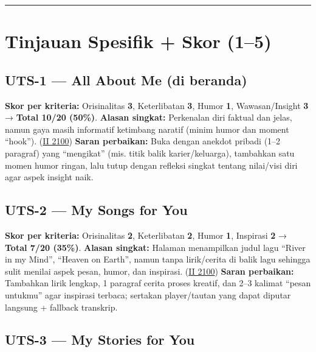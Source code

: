 \documentclass[
  letterpaper,
  DIV=11,
  numbers=noendperiod]{scrreprt}
\begin{document}
\begin{center}\rule{0.5\linewidth}{0.5pt}\end{center}

\section{Tinjauan Spesifik + Skor
(1--5)}\label{tinjauan-spesifik-skor-15}

\subsection{UTS-1 --- All About Me (di
beranda)}\label{uts-1-all-about-me-di-beranda}

\textbf{Skor per kriteria:} Orisinalitas \textbf{3}, Keterlibatan
\textbf{3}, Humor \textbf{1}, Wawasan/Insight \textbf{3} → \textbf{Total
10/20 (50\%)}. \textbf{Alasan singkat:} Perkenalan diri faktual dan
jelas, namun gaya masih informatif ketimbang naratif (minim humor dan
moment ``hook''). (\href{https://ii-2100.github.io/all-about-me/}{II
2100}) \textbf{Saran perbaikan:} Buka dengan anekdot pribadi (1--2
paragraf) yang ``mengikat'' (mis. titik balik karier/keluarga),
tambahkan satu momen humor ringan, lalu tutup dengan refleksi singkat
tentang nilai/visi diri agar aspek insight naik.

\subsection{UTS-2 --- My Songs for You}\label{uts-2-my-songs-for-you}

\textbf{Skor per kriteria:} Orisinalitas \textbf{2}, Keterlibatan
\textbf{2}, Humor \textbf{1}, Inspirasi \textbf{2} → \textbf{Total 7/20
(35\%)}. \textbf{Alasan singkat:} Halaman menampilkan judul lagu ``River
in my Mind'', ``Heaven on Earth'', namun tanpa lirik/cerita di balik
lagu sehingga sulit menilai aspek pesan, humor, dan inspirasi.
(\href{https://ii-2100.github.io/all-about-me/My_Song_for_You/index.html}{II
2100}) \textbf{Saran perbaikan:} Tambahkan lirik lengkap, 1 paragraf
cerita proses kreatif, dan 2--3 kalimat ``pesan untukmu'' agar inspirasi
terbaca; sertakan player/tautan yang dapat diputar langsung + fallback
transkrip.

\subsection{UTS-3 --- My Stories for
You}\label{uts-3-my-stories-for-you-1}
\end{document}

